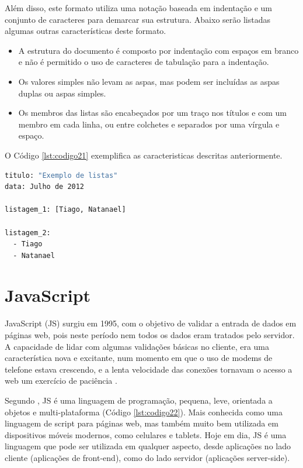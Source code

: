 Além disso, este formato utiliza uma notação baseada em indentação e um conjunto de caracteres para demarcar sua estrutura. Abaixo serão listadas algumas outras características deste formato.

\begin{itemize}
\item A estrutura do documento é composto por indentação com espaços em branco e não é permitido o uso de caracteres de tabulação para a indentação.

\item Os valores simples não levam as aspas, mas podem ser incluídas as aspas duplas ou aspas simples.

\item Os membros das listas são encabeçados por um traço nos títulos e com um membro em cada linha, ou entre colchetes e separados por uma vírgula e espaço.
\end{itemize}

O Código \ref{lst:codigo21} exemplifica as caracteristicas descritas anteriormente.

{\singlespace
\begin{lstlisting}[caption=Estrutura do código \textit{YAML},language=bash,label={lst:codigo21}]
titulo: "Exemplo de listas"
data: Julho de 2012

listagem_1: [Tiago, Natanael]

listagem_2:
  - Tiago
  - Natanael
\end{lstlisting}
}


\section{JavaScript}

JavaScript (JS) surgiu em 1995, com o objetivo de validar a entrada de dados em páginas web, pois neste período nem todos os dados eram tratados pelo servidor. A capacidade de lidar com algumas validações básicas no cliente, era uma característica nova e excitante, num momento em que o uso de modems de telefone estava crescendo, e a lenta velocidade das conexões tornavam o acesso a web um exercício de paciência \cite{ZAKAS}.

Segundo , JS é uma linguagem de programação, pequena, leve, orientada a objetos e multi-plataforma (Código \ref{lst:codigo22}). Mais conhecida como uma linguagem de script para páginas web, mas também muito bem utilizada em dispositivos móveis modernos, como celulares e tablets. Hoje em dia, JS é uma linguagem que pode ser utilizada em qualquer aspecto, desde aplicações no lado cliente (aplicações de front-end), como do lado servidor (aplicações server-side).

